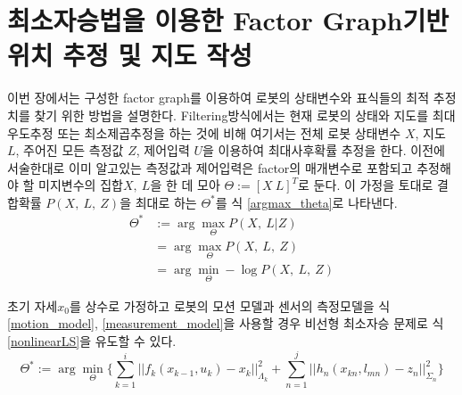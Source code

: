 \documentclass[master,korean,final]{cbnu-ecs}
\begin{document}
\section{최소자승법을 이용한 Factor Graph기반 위치 추정 및 지도 작성}
이번 장에서는 구성한 factor graph를 이용하여 로봇의 상태변수와 표식들의 최적 추정치를 찾기 위한 방법을 설명한다.  Filtering방식에서는 현재 로봇의 상태와 지도를 최대우도추정 또는 최소제곱추정을 하는 것에 비해 여기서는 전체 로봇 상태변수 $X$, 지도 $L$, 주어진 모든 측정값 $Z$, 제어입력 $U$을 이용하여 최대사후확률 추정을 한다. 이전에 서술한대로 이미 알고있는 측정값과 제어입력은 factor의 매개변수로 포함되고 추정해야 할 미지변수의 집합$X,\ L$을 한 데 모아 $\Theta:=[X\ L]^T$로 둔다. 이 가정을 토대로 결합확률 $P(X,\ L,\ Z)$을 최대로 하는 $\Theta^*$를 식 \eqref{argmax_theta}로 나타낸다.
\begin{equation}
\label{argmax_theta}
\begin{split}
\Theta^*&:=\arg\max_\Theta P(X,\ L|Z)\\
&=\arg\max_\Theta P(X,\ L,\ Z)\\
&=\arg\min_\Theta -\log P(X,\ L,\ Z)
\end{split}
\end{equation}

초기 자세$x_0$를 상수로 가정하고 로봇의 모션 모델과 센서의 측정모델을 식 \eqref{motion_model}, \eqref{measurement_model}을 사용할 경우 비선형 최소자승 문제로 식 \eqref{nonlinearLS}을 유도할 수 있다.
\begin{equation}
\label{nonlinearLS}
\Theta^*:=\arg\min_\Theta \bigg\{ \sum_{k=1}^i ||f_k(x_{k-1}, u_k)-x_k||^2_{\Lambda_k} + \sum_{n=1}^j ||h_n(x_{kn}, l_{mn})-z_n||^2_{\Sigma_n}\bigg\}
\end{equation}
\end{document}
